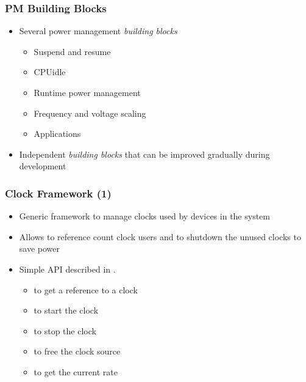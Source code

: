\begin{frame}
  \frametitle{PM Building Blocks}
  \begin{itemize}
  \item Several power management \emph{building blocks}
    \begin{itemize}
    \item Suspend and resume
    \item CPUidle
    \item Runtime power management
    \item Frequency and voltage scaling
    \item Applications
    \end{itemize}
  \item Independent \emph{building blocks} that can be improved
    gradually during development
  \end{itemize}
\end{frame}

\begin{frame}
  \frametitle{Clock Framework (1)}
  \begin{itemize}
  \item Generic framework to manage clocks used by devices in the
    system
  \item Allows to reference count clock users and to shutdown the
    unused clocks to save power
  \item Simple API described in .
    \begin{itemize}
    \item {} to get a reference to a clock
    \item {} to start the clock
    \item {} to stop the clock
    \item {} to free the clock source
    \item {} to get the current rate
    \end{itemize}
  \end{itemize}
\end{frame}

